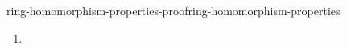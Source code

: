 \documentclass[preview]{standalone}
\begin{document}
\begin{snippetproof}{ring-homomorphism-properties-proof}{ring-homomorphism-properties}{}
\begin{enumerate}
\begin{enumerate}
\begin{align*}
                \varphi(xa) = \varphi(x) \cdot \varphi(a) = 0_B \cdot \varphi(a) = 0_B
            \end{align*}
            it is thus a .
            \item {}
        \end{enumerate}
    \end{enumerate}
\end{snippetproof}
\end{document}
